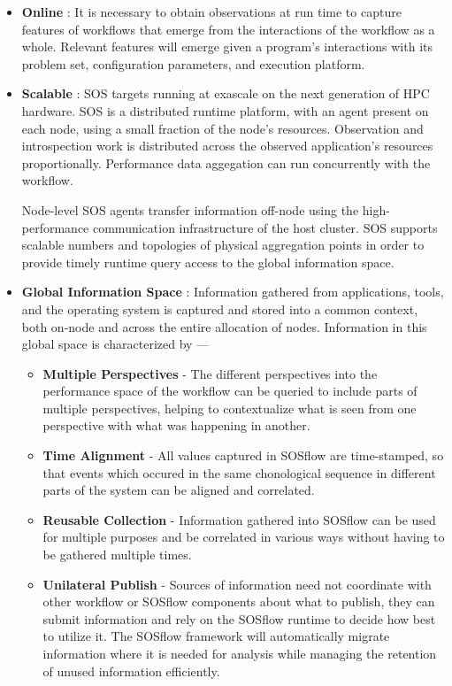 \begin{itemize}
\item \textbf{Online} : It is necessary to obtain observations at run
  time to capture features of workflows that emerge from the
  interactions of the workflow as a whole.
  Relevant features will emerge given a program's interactions with
  its problem set, configuration parameters, and execution platform.
%
\item \textbf{Scalable} : SOS targets running at exascale on the next
  generation of HPC hardware.
%
SOS is a distributed runtime platform, with an agent present on each
node, using a small fraction of the node's resources.
%
Observation and introspection work is distributed across
the observed application's resources proportionally.
%
Performance data aggegation can run concurrently with the workflow.
%
\par
%
Node-level SOS agents transfer information off-node using the
high-performance communication infrastructure of the host cluster.
%
SOS supports scalable numbers and topologies of physical aggregation
points in order to provide timely runtime query access to the global
information space.
%
\item \textbf{Global Information Space} : Information gathered from
  applications, tools, and the operating system is captured and stored
  into a common context, both on-node and across the entire allocation
  of nodes.  Information in this global space is characterized by ---
%
     \begin{itemize}
        \item \textbf{Multiple Perspectives} - The different
          perspectives into the performance space of the workflow can
          be queried to include parts of multiple
          perspectives, helping to contextualize what is seen from one
          perspective with what was happening in another.
        \item \textbf{Time Alignment} - All values captured in SOSflow
          are time-stamped, so that events which occured in the same
          chonological sequence in different parts of the system can be
          aligned and correlated.
        \item \textbf{Reusable Collection} - Information gathered into
          SOSflow can be used for multiple purposes and be correlated
          in various ways without having to be gathered multiple
          times.
        \item \textbf{Unilateral Publish} - Sources of information
          need not coordinate with other workflow or SOSflow
          components about what to publish, they can submit
          information and rely on the SOSflow runtime to decide
          how best to utilize it.
          The SOSflow framework will automatically migrate
          information where it is needed for analysis while managing
          the retention of unused information efficiently.
     \end{itemize}
\end{itemize}


